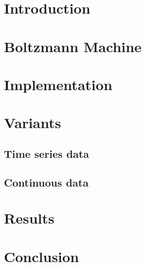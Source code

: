 \documentclass[
	12pt,
	a4paper,
	BCOR10mm,
	DIV14,
	headsepline,
	usegeometry,
]{scrreprt}
\begin{document}
\restoregeometry


\tableofcontents


\chapter{Introduction}


\chapter{Boltzmann Machine}

\cite{Ackley}


\chapter{Implementation}


\chapter{Variants}


\section{Time series data}


\section{Continuous data}


\chapter{Results}


\chapter{Conclusion}




\end{document}
